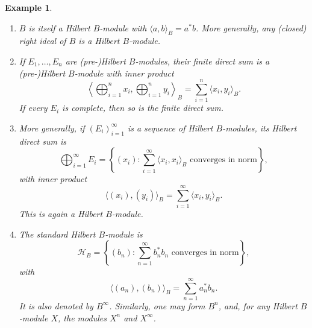 \documentclass{book}
\newtheorem{example}[definition]{Example}
\begin{document}
\begin{example}
  \begin{enumerate}
    \item \(B\) is itself a Hilbert \(B\)-module with \(\langle a,b\rangle_B=a^*b\).
      More generally, any (closed) right ideal of \(B\) is a Hilbert \(B\)-module.
    \item If \(E_1,\ldots,E_n\) are (pre-)Hilbert \(B\)-modules, their finite
      direct sum is a (pre-)Hilbert \(B\)-module with inner product
      \[
        \left\langle\bigoplus_{i=1}^n x_i,\bigoplus_{i=1}^n y_i\right\rangle_B
        =
        \sum_{i=1}^n\langle x_i,y_i\rangle_B.
      \]
      If every \(E_i\) is complete, then so is the finite direct sum.
    \item More generally, if \((E_i)_{i=1}^\infty\) is a sequence of Hilbert
      \(B\)-modules, its Hilbert direct sum is
      \[
        \bigoplus_{i=1}^\infty E_i
        =
        \left\{(x_i):
        \sum_{i=1}^\infty\langle x_i,x_i\rangle_B
        \text{ converges in norm}\right\},
      \]
      with inner product
      \[
        \langle(x_i),(y_i)\rangle_B
        =
        \sum_{i=1}^\infty\langle x_i,y_i\rangle_B.
      \]
      This is again a Hilbert \(B\)-module.
    \item The \textnormal{standard Hilbert \(B\)-module} is
      \[
        \mathcal H_B
        =
        \left\{(b_n):
        \sum_{n=1}^\infty b_n^*b_n\text{ converges in norm}\right\},
      \]
      with
      \[
        \langle(a_n),(b_n)\rangle_B
        =
        \sum_{n=1}^\infty a_n^*b_n.
      \]
      It is also denoted by \(B^\infty\). Similarly, one may form \(B^n\),
      and, for any Hilbert \(B\)-module \(X\), the modules \(X^n\) and
      \(X^\infty\).
  \end{enumerate}
\end{example}
\end{document}
